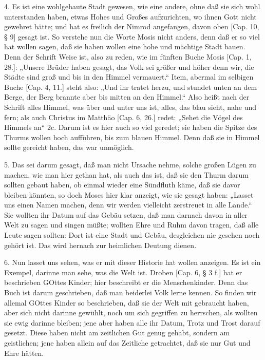 4. Es ist eine wohlgebaute Stadt gewesen, wie eine andere, ohne daß sie sich wohl unterstanden haben, etwas Hohes und Großes aufzurichten, wo ihnen Gott nicht gewehret hätte; und hat es freilich der Nimrod angefangen, davon oben [Cap. 10, § 9] gesagt ist. So verstehe nun die Worte Mosis nicht anders, denn daß er so viel hat wollen sagen, daß sie haben wollen eine hohe und mächtige Stadt bauen. Denn der Schrift Weise ist, also zu reden, wie im fünften Buche Mosis [Cap. 1, 28.]: „Unsere Brüder haben gesagt, das Volk sei größer und höher denn wir, die Städte sind groß und bis in den Himmel vermauert.“ Item, abermal im selbigen Buche [Cap. 4, 11.] steht also: „Und ihr tratet herzu, und stundet unten an dem Berge, der Berg brannte aber bis mitten an den Himmel.“ Also heißt nach der Schrift alles Himmel,
was über und unter uns ist, alles, das blau sieht, nahe und fern; als auch Christus im Matthäo [Cap. 6, 26.] redet: „Sehet die Vögel des Himmels an“ 2c. Darum ist es hier auch so viel geredet; sie haben die Spitze des Thurms wollen hoch aufführen, bis zum blauen Himmel. Denn daß sie in Himmel sollte gereicht haben, das war unmöglich.

5. Das sei darum gesagt, daß man nicht Ursache nehme, solche großen Lügen zu machen, wie man hier gethan hat, als auch das ist, daß sie den Thurm darum sollten gebaut haben, ob einmal wieder eine Sündfluth käme, daß sie davor bleiben könnten, so doch Moses hier klar anzeigt, wie sie gesagt haben: „Lasset uns einen Namen machen, denn wir werden vielleicht zerstreuet in alle Lande.“ Sie wollten ihr Datum auf das Gebäu setzen, daß man darnach davon in aller Welt zu sagen und singen müßte; wollten Ehre und Ruhm davon tragen, daß alle Leute sagen sollten: Dort ist eine Stadt und Gebäu, desgleichen nie gesehen noch gehört ist. Das wird hernach zur heimlichen Deutung dienen.

6. Nun lasset uns sehen, was er mit dieser Historie hat wollen anzeigen. Es ist ein Exempel, darinne man sehe, was die Welt ist. Droben [Cap. 6, § 3 f.] hat er beschrieben GOttes Kinder; hier beschreibt er die Menschenkinder. Denn das Buch ist darum geschrieben, daß man beiderlei Volk lerne kennen. So finden wir allemal GOttes Kinder so beschrieben, daß sie der Welt mit gebraucht haben, aber sich nicht darinne gewühlt, noch um sich gegriffen zu herrschen, als wollten sie ewig darinne bleiben; jene aber haben alle ihr Datum, Trotz und Trost darauf gesetzt. Diese haben nicht am zeitlichen Gut genug gehabt, sondern am geistlichen; jene haben allein auf das Zeitliche getrachtet, daß sie nur Gut und Ehre hätten.

